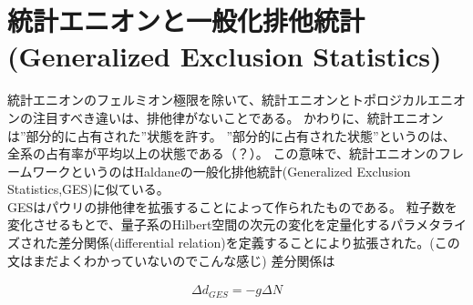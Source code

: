 \documentclass[a4paper,11pt]{jsarticle}
\begin{document}
\section{統計エニオンと一般化排他統計(Generalized Exclusion Statistics)}
統計エニオンのフェルミオン極限を除いて、統計エニオンとトポロジカルエニオンの注目すべき違いは、排他律がないことである。
かわりに、統計エニオンは”部分的に占有された”状態を許す。
”部分的に占有された状態”というのは、全系の占有率が平均以上の状態である（？）。
この意味で、統計エニオンのフレームワークというのはHaldaneの一般化排他統計(Generalized Exclusion Statistics,GES)に似ている。\\
GESはパウリの排他律を拡張することによって作られたものである。
粒子数を変化させるもとで、量子系のHilbert空間の次元の変化を定量化するパラメタライズされた差分関係(differential relation)を定義することにより拡張された。(この文はまだよくわかっていないのでこんな感じ)
差分関係は

\begin{align}
\Delta  d_{GES}=-g \Delta  N
\end{align}
\end{document}
